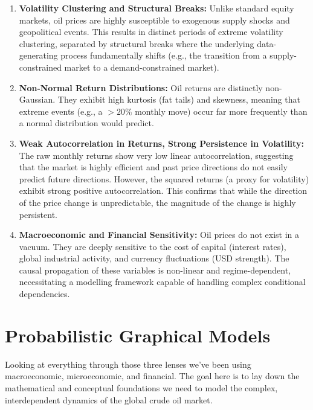 \documentclass[11pt,a4paper]{article}
\begin{document}
\begin{enumerate}
    \item \textbf{Volatility Clustering and Structural Breaks:} Unlike standard 
    equity markets, oil prices are highly susceptible to exogenous supply shocks 
    and geopolitical events. This results in distinct periods of extreme 
    volatility clustering, separated by structural breaks where the underlying 
    data-generating process fundamentally shifts (e.g., the transition 
    from a supply-constrained market to a demand-constrained market).
    \item \textbf{Non-Normal Return Distributions:} Oil returns are distinctly 
    non-Gaussian. They exhibit high kurtosis (fat tails) and skewness, 
    meaning that extreme events (e.g., a $>20\%$ monthly move) occur far 
    more frequently than a normal distribution would predict.
    \item \textbf{Weak Autocorrelation in Returns, Strong Persistence in Volatility:} 
    The raw monthly returns show very low linear autocorrelation, 
    suggesting that the market is highly efficient and past price 
    directions do not easily predict future directions. However, the squared 
    returns (a proxy for volatility) exhibit strong positive autocorrelation. 
    This confirms that while the direction of the price change is unpredictable, 
    the magnitude of the change is highly persistent.
    \item \textbf{Macroeconomic and Financial Sensitivity:} Oil prices do not 
    exist in a vacuum. They are deeply sensitive to the cost of capital 
    (interest rates), global industrial activity, and currency fluctuations 
    (USD strength). The causal propagation of these variables is non-linear 
    and regime-dependent, necessitating a modelling framework capable of 
    handling complex conditional dependencies.
\end{enumerate}















\section{Probabilistic Graphical Models}

Looking at everything through those three lenses we've been using macroeconomic, 
microeconomic, and financial. The goal here is to lay down the mathematical 
and conceptual foundations we need to model the complex, interdependent 
dynamics of the global crude oil market.
\end{document}
